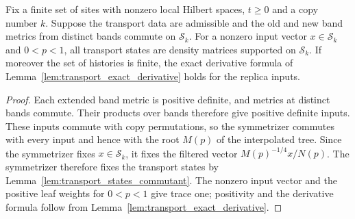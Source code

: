 \begin{lemma}\label{lem:replica_transport_states}
    \leanok
    Fix a finite set of sites with nonzero local Hilbert spaces, $t\ge0$ and a
    copy number $k$. Suppose the transport data are admissible and the old and
    new band metrics from distinct bands commute on $\mathcal S_k$.
    For a nonzero input vector $x\in\mathcal S_k$ and $0<p<1$, all transport
    states are density matrices supported on $\mathcal S_k$. If moreover the
    set of histories is finite, the exact derivative formula of
    Lemma~\ref{lem:transport_exact_derivative} holds for the replica inputs.
\end{lemma}

\begin{proof}\leanok
    Each extended band metric is positive definite, and metrics at distinct
    bands commute. Their products over bands therefore give positive definite
    inputs. These inputs commute with copy
    permutations, so the symmetrizer commutes with every input and hence with
    the root $M(p)$ of the interpolated tree. Since the symmetrizer fixes
    $x\in\mathcal S_k$, it fixes the filtered vector $M(p)^{-1/4}x/N(p)$.
    The symmetrizer therefore fixes the transport states by
    Lemma~\ref{lem:transport_states_commutant}.
    The nonzero input vector and the positive leaf weights for $0<p<1$ give
    trace one; positivity and the derivative formula follow from
    Lemma~\ref{lem:transport_exact_derivative}.
\end{proof}

